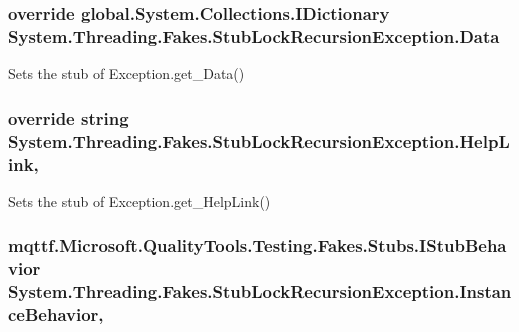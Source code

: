 \hypertarget{class_system_1_1_threading_1_1_fakes_1_1_stub_lock_recursion_exception_a2bf3dfc3da26ba73114b04cf3f2c390b}{
\subsubsection[{Data}]{\setlength{\rightskip}{0pt plus 5cm}override global.\-System.\-Collections.\-I\-Dictionary System.\-Threading.\-Fakes.\-Stub\-Lock\-Recursion\-Exception.\-Data\hspace{0.3cm}{\ttfamily [get]}}}\label{class_system_1_1_threading_1_1_fakes_1_1_stub_lock_recursion_exception_a2bf3dfc3da26ba73114b04cf3f2c390b}


Sets the stub of Exception.\-get\-\_\-\-Data()

\hypertarget{class_system_1_1_threading_1_1_fakes_1_1_stub_lock_recursion_exception_a49f369d06aa8c75fe8cf83d203924eef}{
\subsubsection[{Help\-Link}]{\setlength{\rightskip}{0pt plus 5cm}override string System.\-Threading.\-Fakes.\-Stub\-Lock\-Recursion\-Exception.\-Help\-Link\hspace{0.3cm}{\ttfamily [get]}, {\ttfamily [set]}}}\label{class_system_1_1_threading_1_1_fakes_1_1_stub_lock_recursion_exception_a49f369d06aa8c75fe8cf83d203924eef}


Sets the stub of Exception.\-get\-\_\-\-Help\-Link()

\hypertarget{class_system_1_1_threading_1_1_fakes_1_1_stub_lock_recursion_exception_a70acb7ae397162b7b822e333fd9657a7}{
\subsubsection[{Instance\-Behavior}]{\setlength{\rightskip}{0pt plus 5cm}mqttf.\-Microsoft.\-Quality\-Tools.\-Testing.\-Fakes.\-Stubs.\-I\-Stub\-Behavior System.\-Threading.\-Fakes.\-Stub\-Lock\-Recursion\-Exception.\-Instance\-Behavior\hspace{0.3cm}{\ttfamily [get]}, {\ttfamily [set]}}}\label{class_system_1_1_threading_1_1_fakes_1_1_stub_lock_recursion_exception_a70acb7ae397162b7b822e333fd9657a7}


